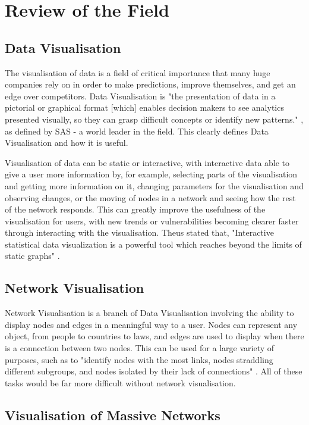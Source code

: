 \documentclass[../dissertation.tex]{subfiles}
\begin{document}
\chapter{Review of the Field}

\section{Data Visualisation}

The visualisation of data is a field of critical importance that many huge companies rely on in order to make predictions, improve themselves, and get an edge over competitors. Data Visualisation is "the presentation of data in a pictorial or graphical format [which] enables decision makers to see analytics presented visually, so they can grasp difficult concepts or identify new patterns." \cite{sasdv}, as defined by SAS - a world leader in the field. This clearly defines Data Visualisation and how it is useful.

Visualisation of data can be static or interactive, with interactive data able to give a user more information by, for example, selecting parts of the visualisation and getting more information on it, changing parameters for the visualisation and observing changes, or the moving of nodes in a network and seeing how the rest of the network responds. This can greatly improve the usefulness of the visualisation for users, with new trends or vulnerabilities becoming clearer faster through interacting with the visualisation. Theus stated that, "Interactive statistical data visualization is a powerful tool which reaches beyond the limits of static graphs" \cite{theus2002interactive}.

\section{Network Visualisation}

Network Visualisation is a branch of Data Visualisation involving the ability to display nodes and edges in a meaningful way to a user. Nodes can represent any object, from people to countries to laws, and edges are used to display when there is a connection between two nodes. This can be used for a large variety of purposes, such as to "identify nodes with the most links, nodes straddling different subgroups, and nodes isolated by their lack of connections" \cite{flowingdata}. All of these tasks would be far more difficult without network visualisation.

\section{Visualisation of Massive Networks}
\end{document}
